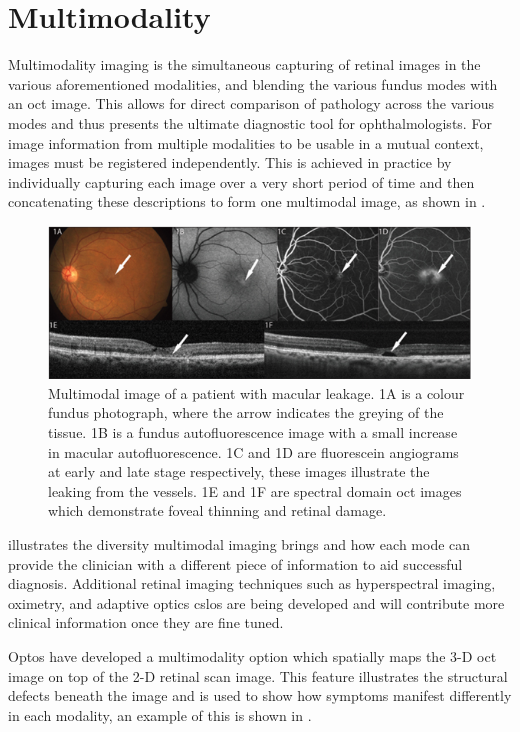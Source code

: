 \section{Multimodality}

Multimodality imaging is the simultaneous capturing of retinal images in the various
aforementioned modalities, and blending the various fundus modes with an \Gls{oct}
image.\cite{abramoff2010retinal} This allows for direct comparison of pathology
across the various modes and thus presents the ultimate diagnostic tool for
ophthalmologists. For image information from multiple modalities to be usable in a
mutual context, images must be registered independently. This is achieved in
practice by individually capturing each image over a very short period of time
and then concatenating these descriptions to form one multimodal image, as
shown in .

\begin{figure}[H]
\centering
\includegraphics{figures/multitwo}
\caption{Multimodal image of a patient with macular leakage. 1A is a colour fundus
photograph, where the arrow indicates the greying of the tissue. 1B is a fundus
autofluorescence image with a small increase in macular autofluorescence. 1C and 1D
are fluorescein angiograms at early and late stage respectively, these images illustrate
the leaking from the vessels. 1E and 1F are spectral domain \Gls{oct} images which
demonstrate foveal thinning and retinal damage.\cite{abramoff2010retinal}}
\label{fig:mt}
\end{figure}

 illustrates the diversity multimodal imaging brings and how each mode
can provide the clinician with a different piece of information to aid successful
diagnosis. Additional retinal imaging techniques such as hyperspectral imaging,
oximetry, and adaptive optics \gls{cslo}s are being developed and will contribute more
clinical information once they are fine tuned.

Optos have developed a multimodality option which spatially maps the 3-D \Gls{oct}
image on top of the 2-D retinal scan image. This feature illustrates the structural
defects beneath the image and is used to show how symptoms manifest differently in
each modality, an example of this is shown in .

